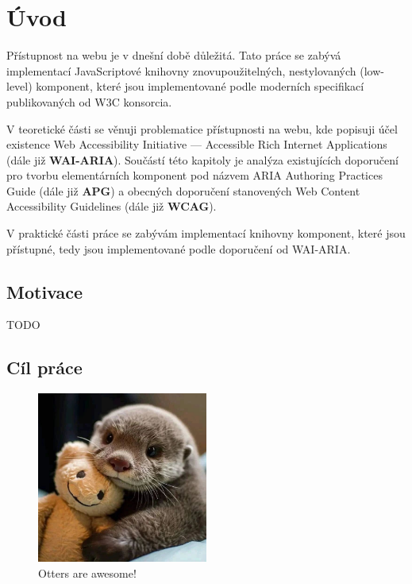 \chapter{Úvod}

Přístupnost na webu je v dnešní době důležitá. Tato práce se zabývá implementací JavaScriptové knihovny
znovupoužitelných, nestylovaných (low-level) komponent, které jsou implementované podle moderních specifikací publikovaných od W3C konsorcia.

V teoretické části se věnuji problematice přístupnosti na webu, kde popisuji účel existence
Web Accessibility Initiative --- Accessible Rich Internet Applications (dále již \textbf{WAI-ARIA}).
Součástí této kapitoly je analýza existujících doporučení pro tvorbu elementárních
komponent pod názvem ARIA Authoring Practices Guide (dále již \textbf{APG}) a
obecných doporučení stanovených Web Content Accessibility Guidelines (dále již \textbf{WCAG}).

V praktické části práce se zabývám implementací knihovny komponent,
které jsou přístupné, tedy jsou implementované podle doporučení od WAI-ARIA.

\section{Motivace}

TODO

\section{Cíl práce}


\begin{figure}
    \centering
    \includegraphics[width=0.5\textwidth]{./assets/figures/chapter-1/otter.jpg}
    \caption{Otters are awesome!}
\end{figure}
